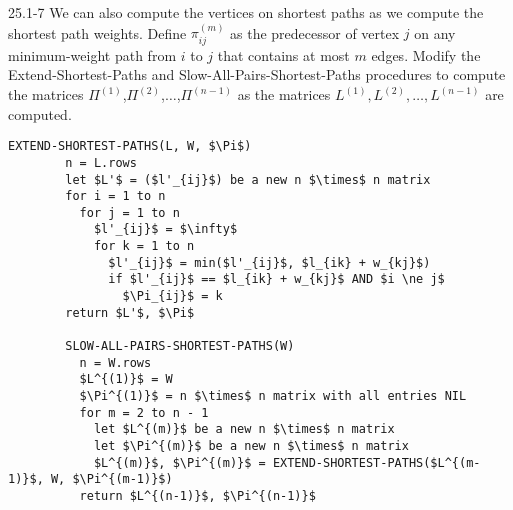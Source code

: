 \begin{problem}{25.1-7}
  We can also compute the vertices on shortest paths as we compute the shortest path weights.  Define $\pi^{(m)}_{ij}$
  as the predecessor of vertex $j$ on any minimum-weight path from $i$ to $j$ that contains at most $m$ edges.  Modify
  the Extend-Shortest-Paths and Slow-All-Pairs-Shortest-Paths procedures to compute the matrices
  $\Pi^{(1)}$,$\Pi^{(2)}$,$\ldots$,$\Pi^{(n-1)}$ as the matrices $L^{(1)},L^{(2)},\ldots,L^{(n-1)}$ are computed.
  \begin{solution}
    \begin{lstlisting}[mathescape]
      EXTEND-SHORTEST-PATHS(L, W, $\Pi$)
        n = L.rows
        let $L'$ = ($l'_{ij}$) be a new n $\times$ n matrix
        for i = 1 to n
          for j = 1 to n
            $l'_{ij}$ = $\infty$
            for k = 1 to n
              $l'_{ij}$ = min($l'_{ij}$, $l_{ik} + w_{kj}$)
              if $l'_{ij}$ == $l_{ik} + w_{kj}$ AND $i \ne j$
                $\Pi_{ij}$ = k
        return $L'$, $\Pi$

        SLOW-ALL-PAIRS-SHORTEST-PATHS(W)
          n = W.rows
          $L^{(1)}$ = W
          $\Pi^{(1)}$ = n $\times$ n matrix with all entries NIL
          for m = 2 to n - 1
            let $L^{(m)}$ be a new n $\times$ n matrix
            let $\Pi^{(m)}$ be a new n $\times$ n matrix
            $L^{(m)}$, $\Pi^{(m)}$ = EXTEND-SHORTEST-PATHS($L^{(m-1)}$, W, $\Pi^{(m-1)}$)
          return $L^{(n-1)}$, $\Pi^{(n-1)}$
    \end{lstlisting}
  \end{solution}
\end{problem}


